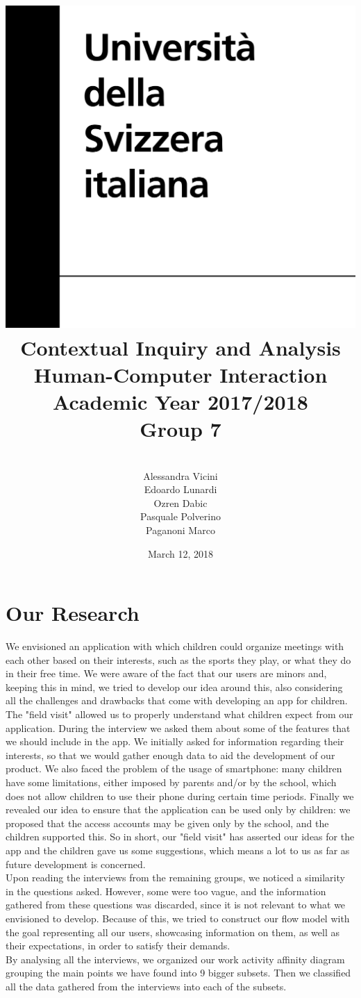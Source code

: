 \documentclass[12pt]{report}
\title {
	\includegraphics[width = .2\linewidth]{University-of-Lugano.png} \break \break
	{\bf\Huge Contextual Inquiry and Analysis}
	\\\large Human-Computer Interaction
	\\\small Academic Year 2017/2018 \break
	\\\large \textbf{Group 7}}
\author{
	\\\large Alessandra Vicini \\ Edoardo Lunardi \\ Ozren Dabic \\ Pasquale Polverino \\ Paganoni Marco}
\date{March 12, 2018}
\begin{document}
	\pagestyle{empty}
	\maketitle
	\section*{\huge Our Research}
	We envisioned an application with which children could organize meetings
	with each other based on their interests, such as the sports they play,
	or what they do in their free time. We were aware of the fact
	that our users are minors and, keeping this in mind, we tried to develop
	our idea around this, also considering all the challenges and drawbacks
	that come with developing an app for children. The "field visit" allowed us to properly
	understand what children expect from our application. During the interview we asked
	them about some of the features that we should include in the app.
	We initially asked for information regarding their interests, so that
	we would gather enough data to aid the development of our product.
	We also faced the problem of the usage of smartphone: many children have some limitations, either
	imposed by parents and/or by the school, which does not allow children
	to use their phone during certain time periods. Finally we revealed our idea to
	ensure that the application can be used only by children: we
	proposed that the access accounts may be given only by the school, and the
	children supported this. So in short, our "field visit" has
	asserted our ideas for the app and the children gave us some suggestions,
	which means a lot to us as far as future development is concerned.\\

	Upon reading the interviews from the remaining groups, we noticed
	a similarity in the questions asked. However, some were too vague,
	and the information gathered from these questions was discarded,
	since it is not relevant to what we envisioned to develop.
	Because of this, we tried to construct our flow model with the goal
	representing all our users, showcasing information on them,
	as well as their expectations, in order to satisfy their demands.\\

	By analysing all the interviews, we organized our work activity affinity diagram
	grouping the main points we have found into 9 bigger subsets.
	Then we classified all the data gathered from the interviews into each of the subsets.
\end{document}
